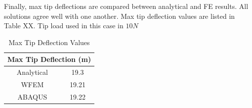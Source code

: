 \documentclass[12pt]{article}
\begin{document}
Finally, max tip deflections are compared between analytical and FE results. All solutions agree well with one another. Max tip deflection values are listed in Table XX. Tip load used in this case in $10N$

\begin{table}[H]
  \centering
  \caption{Max Tip Deflection Values}
    \begin{tabular}{cc}
    \toprule
    \multicolumn{2}{c}{\textbf{Max Tip Deflection (m)}} \\
    \midrule
    Analytical & 19.3 \\
    WFEM  & 19.21 \\
    ABAQUS & 19.22 \\
    \bottomrule
    \end{tabular}%
  \label{tab:T3}%
\end{table}%
\end{document}
